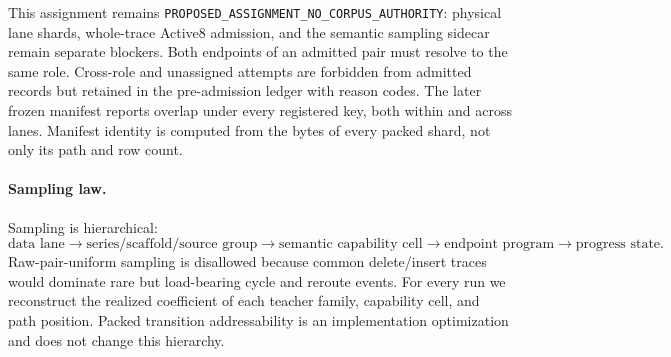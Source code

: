 This assignment remains
\texttt{PROPOSED\_ASSIGNMENT\_NO\_CORPUS\_AUTHORITY}: physical lane shards,
whole-trace Active8 admission, and the semantic sampling sidecar remain
separate blockers. Both endpoints of an admitted pair must resolve to the same
role. Cross-role and unassigned attempts are forbidden from admitted records
but retained in the pre-admission ledger with reason codes. The later frozen
manifest reports overlap under every registered key, both within and across
lanes. Manifest identity is computed from the bytes of every packed shard, not
only its path and row count.

\paragraph{Sampling law.}
Sampling is hierarchical:
\[
  \text{data lane}
  \rightarrow
  \text{series/scaffold/source group}
  \rightarrow
  \text{semantic capability cell}
  \rightarrow
  \text{endpoint program}
  \rightarrow
  \text{progress state}.
\]
Raw-pair-uniform sampling is disallowed because common delete/insert traces
would dominate rare but load-bearing cycle and reroute events.  For every run
we reconstruct the realized coefficient of each teacher family, capability
cell, and path position.  Packed transition addressability is an
implementation optimization and does not change this hierarchy.


